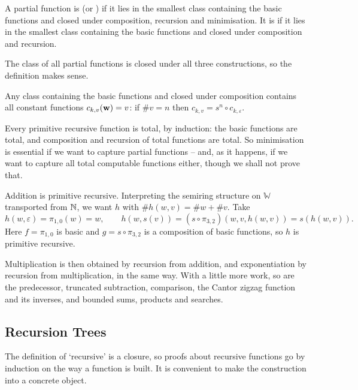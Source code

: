 \documentclass[a4paper]{scrartcl}
\newcommand{\WW}{\mathbb{W}}
\newcommand{\eps}{\varepsilon}
\begin{document}
\begin{definition}
	A partial function is  (or ) if it lies in the smallest class containing the basic functions and closed under composition, recursion and minimisation. It is  if it lies in the smallest class containing the basic functions and closed under composition and recursion.
\end{definition}

The class of all partial functions is closed under all three constructions, so the definition makes sense.

\begin{remark}
	Any class containing the basic functions and closed under composition contains all constant functions $c_{k,v}(\mathbf{w}) = v$: if $\#v = n$ then $c_{k,v} = s^n \circ c_{k,\eps}$.
\end{remark}

Every primitive recursive function is total, by induction: the basic functions are total, and composition and recursion of total functions are total. So minimisation is essential if we want to capture partial functions -- and, as it happens, if we want to capture all total computable functions either, though we shall not prove that.

\begin{example}\label{ex:addition}
	Addition is primitive recursive. Interpreting the semiring structure on $\WW$ transported from $\mathbb{N}$, we want $h$ with $\#h(w,v) = \#w + \#v$. Take
	$$h(w,\eps) = \pi_{1,0}(w) = w, \qquad h(w,s(v)) = (s\circ\pi_{3,2})(w,v,h(w,v)) = s(h(w,v)).$$
	Here $f = \pi_{1,0}$ is basic and $g = s \circ \pi_{3,2}$ is a composition of basic functions, so $h$ is primitive recursive.

	Multiplication is then obtained by recursion from addition, and exponentiation by recursion from multiplication, in the same way. With a little more work, so are the predecessor, truncated subtraction, comparison, the Cantor zigzag function and its inverses, and bounded sums, products and searches.
\end{example}

\subsection{Recursion Trees}

The definition of `recursive' is a closure, so proofs about recursive functions go by induction on the way a function is built. It is convenient to make the construction into a concrete object.
\end{document}
